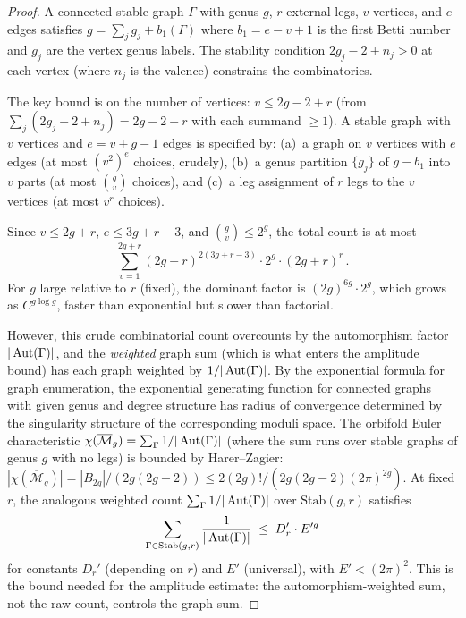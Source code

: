 \begin{proof}
A connected stable graph $\Gamma$ with genus $g$, $r$ external
legs, $v$ vertices, and $e$ edges satisfies
$g = \sum_j g_j + b_1(\Gamma)$ where $b_1 = e - v + 1$ is the
first Betti number and $g_j$ are the vertex genus labels. The
stability condition $2g_j - 2 + n_j > 0$ at each vertex (where
$n_j$ is the valence) constrains the combinatorics.

The key bound is on the number of vertices: $v \leq 2g - 2 + r$
(from $\sum_j (2g_j - 2 + n_j) = 2g - 2 + r$ with each summand
$\geq 1$). A stable graph with $v$ vertices and $e = v + g - 1$
edges is specified by: (a)~a graph on $v$ vertices with $e$ edges
(at most $(v^2)^e$ choices, crudely), (b)~a genus partition
$\{g_j\}$ of $g - b_1$ into $v$ parts (at most $\binom{g}{v}$
choices), and (c)~a leg assignment of $r$ legs to the $v$ vertices
(at most $v^r$ choices).

Since $v \leq 2g + r$, $e \leq 3g + r - 3$, and
$\binom{g}{v} \leq 2^g$, the total count is at most
\[
\sum_{v=1}^{2g+r} (2g+r)^{2(3g+r-3)} \cdot 2^g \cdot (2g+r)^r\,.
\]
For $g$ large relative to $r$ (fixed), the dominant factor is
$(2g)^{6g} \cdot 2^g$, which grows as $C^{g \log g}$, faster
than exponential but slower than factorial.

However, this crude combinatorial count overcounts by the
automorphism factor $|\operatorname{Aut}(\Gamma)|$, and the \emph{weighted}
graph sum (which is what enters the amplitude bound) has each
graph weighted by $1/|\operatorname{Aut}(\Gamma)|$. By the exponential
formula for graph enumeration, the exponential generating
function for connected graphs with given genus and degree
structure has radius of convergence determined by the singularity
structure of the corresponding moduli space. The orbifold Euler
characteristic $\chi(\overline{\mathcal{M}}_g) =
\sum_\Gamma 1/|\operatorname{Aut}(\Gamma)|$ (where the sum runs over stable
graphs of genus $g$ with no legs) is bounded by Harer--Zagier:
$|\chi(\overline{\mathcal{M}}_g)| = |B_{2g}|/(2g(2g-2)) \leq
2(2g)!/(2g(2g-2)(2\pi)^{2g})$. At fixed $r$, the analogous
weighted count $\sum_\Gamma 1/|\operatorname{Aut}(\Gamma)|$ over
$\mathrm{Stab}(g,r)$ satisfies
\begin{equation}\label{eq:weighted-graph-count}
\sum_{\Gamma \in \mathrm{Stab}(g,r)}
\frac{1}{|\operatorname{Aut}(\Gamma)|}
\;\leq\;
D_r' \cdot E'^g
\end{equation}
for constants $D_r'$ (depending on $r$) and $E'$ (universal),
with $E' < (2\pi)^2$. This is the bound needed for the
amplitude estimate: the automorphism-weighted sum, not the raw
count, controls the graph sum.
\end{proof}

